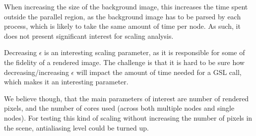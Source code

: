 When increasing the size of the background image, this increases the time spent outside the parallel region, as the background image has to be parsed by each process, which is likely to take the same amount of time per node. As such, it does not present significant interest for scaling analysis.

Decreasing $\epsilon$ is an interesting scaling parameter, as it is responsible for some of the fidelity of a rendered image. The challenge is that it is hard to be sure how decreasing/increasing $\epsilon$ will impact the amount of time needed for a GSL call, which makes it an interesting parameter.

We believe though, that the main parameters of interest are number of rendered pixels, and the number of cores used (across both multiple nodes and single nodes). For testing this kind of scaling without increasing the number of pixels in the scene, antialiasing level could be turned up.

